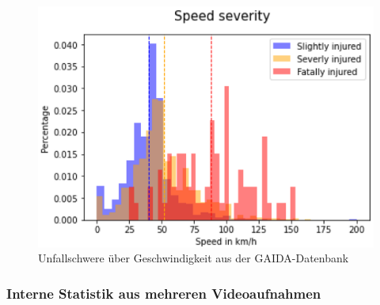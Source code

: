 \begin{figure}
	\centering
	\includegraphics[width=\linewidth]{Bilder/SpeedSeverity.png}
	\caption{Unfallschwere über Geschwindigkeit aus der GAIDA-Datenbank\citep{Maire2020}}
	\label{fig:SpeedSeverity}
\end{figure}


%
%
%

\subsubsection{Interne Statistik aus mehreren Videoaufnahmen}



